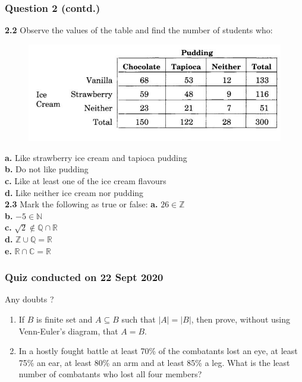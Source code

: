 \documentclass[xcolor=svgnames]{beamer}
\begin{document}
\begin{frame}
\frametitle{Question 2 (contd.)}
\begin{multicols}{2}
\small{
\textbf{2.2} Observe the values of the table and find the number of students who:
\begin{center}
\begin{figure}
    \includegraphics[width=\linewidth]{dstut3q2table.png}
\end{figure}
\end{center}
\textbf{a.} Like strawberry ice cream and tapioca pudding \\
\textbf{b.} Do not like pudding \\
\textbf{c.} Like at least one of the ice cream flavours \\
\textbf{d.} Like neither ice cream nor pudding\\
\vspace{1mm}
\hline
\vspace{1mm}
\textbf{2.3} Mark the following as true or false:
\textbf{a.} $26 \in \mathbb{Z}  $\\
\textbf{b.} $-5 \in \mathbb{N}  $\\
\textbf{c.} $\sqrt{2} \notin \mathbb{Q} \cap \mathbb{R}$ \\
\textbf{d.} $\mathbb{Z} \cup \mathbb{Q} = \mathbb{R}$ \\
\textbf{e.} $\mathbb{R} \cap \mathbb{C} = \mathbb{R}$ \\
}
\end{multicols}
\end{frame}

\begin{frame}
\frametitle{Quiz conducted on 22 Sept 2020}
Any doubts ?
\begin{enumerate}
    \item If $B$ is finite set and $A \subseteq B$ such that $|A| = |B|$, then prove, without using Venn-Euler's diagram, that $A = B$.
    \item In a hostly fought battle at least 70\% of the combatants lost an eye, at least 75\% an ear, at least 80\% an arm and at least 85\% a leg. What is the least number of combatants who lost all four members?
\end{enumerate}
\end{frame}
\end{document}
